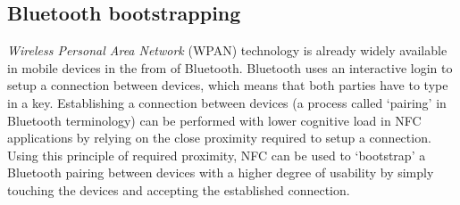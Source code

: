 \subsection{Bluetooth bootstrapping}
\textit{Wireless Personal Area Network} (WPAN) technology is already widely available in mobile devices in the from of Bluetooth.
Bluetooth uses an interactive login to setup a connection between devices, which means that both parties have to type in a key.
Establishing a connection between devices (a process called `pairing' in Bluetooth terminology) can be performed with lower cognitive load in NFC applications by relying on the close proximity required to setup a connection.
Using this principle of required proximity, NFC can be used to `bootstrap' a Bluetooth pairing between devices with a higher degree of usability by simply touching the devices and accepting the established connection. \cite{scarfone2008guide}



